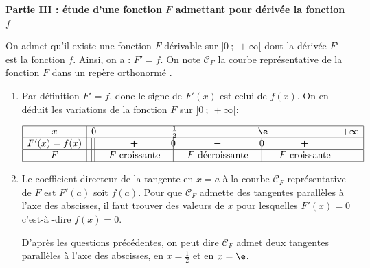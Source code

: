 \bigskip

\textbf{Partie III : étude d'une fonction \boldmath $F$\unboldmath{} admettant pour dérivée la fonction \boldmath $f$\unboldmath}

\medskip

On admet qu'il existe une fonction $F$ dérivable sur $]0~;~+\infty[$ dont la dérivée $F'$ est la fonction $f$.
Ainsi, on a : $F' = f$.
On note $\mathcal{C}_F$ la courbe représentative de la fonction $F$ dans un repère orthonormé \Oij. 

\begin{enumerate}
\item 
Par définition $F'= f$, donc le signe de $F'(x)$ est celui de $f(x)$. On en déduit les variations de la fonction $F$ sur $]0~;~ +\infty[$:

\begin{center}
{
\renewcommand{\arraystretch}{1.5}
\def\esp{\hspace*{2cm}}
$\begin{array}{|c |l *{6}{c} |} 
\hline
x  & 0 & \esp & \frac{1}{2} & \esp & \e & \esp & +\infty \\
\hline
F'(x)=f(x) & \vline\;\vline\; & \pmb{+} &  \vline\hspace{-2.7pt}{0} & \pmb{-} & \vline\hspace{-2.7pt}{0} & \pmb{+} &\\
\hline
F & \vline\;\vline\; & F \text{ croissante} &  \vline\hspace{-2.7pt}{\phantom 0} & F \text{ décroissante} & \vline\hspace{-2.7pt}{\phantom 0} & F \text{ croissante} &\\
\hline
\end{array}$
}
\end{center}
\item Le coefficient directeur de la tangente en $x=a$ à  la courbe $\mathcal{C}_F$ représentative  de $F$ est $F'(a)$ soit $f(a)$. Pour que $\mathcal{C}_F$ admette des tangentes parallèles à l'axe des abscisses, il faut trouver des valeurs de $x$ pour lesquelles $F'(x)=0$ c'est-à -dire $f(x)=0$.

D'après les questions précédentes, on peut dire  $\mathcal{C}_F$ admet deux tangentes parallèles à  l'axe des abscisses, en $x=\frac{1}{2}$ et en $x=\e$.
\end{enumerate}
